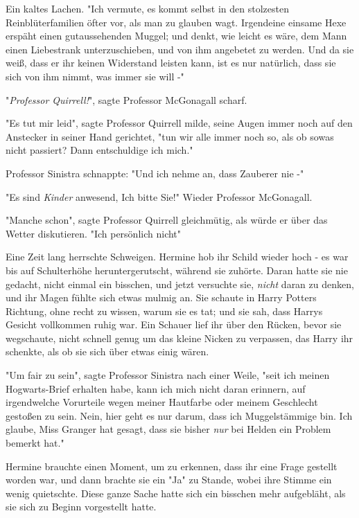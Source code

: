 {Ein kaltes Lachen. "Ich vermute, es kommt selbst in den stolzesten Reinblüterfamilien öfter vor, als man zu glauben wagt. Irgendeine einsame Hexe erspäht einen gutaussehenden Muggel; und denkt, wie leicht es wäre, dem Mann einen Liebestrank unterzuschieben, und von ihm angebetet zu werden. Und da sie weiß, dass er ihr keinen Widerstand leisten kann, ist es nur natürlich, dass sie sich von ihm nimmt, was immer sie will -"

"\emph{Professor Quirrell!}", sagte Professor McGonagall scharf.

"Es tut mir leid", sagte Professor Quirrell milde, seine Augen immer noch auf den Anstecker in seiner Hand gerichtet, "tun wir alle immer noch so, als ob sowas nicht passiert? Dann entschuldige ich mich."

Professor Sinistra schnappte: "Und ich nehme an, dass Zauberer nie -"

"Es sind \emph{Kinder} anwesend, Ich bitte Sie!" Wieder Professor McGonagall.

"Manche schon", sagte Professor Quirrell gleichmütig, als würde er über das Wetter diskutieren. "Ich persönlich nicht"

Eine Zeit lang herrschte Schweigen. Hermine hob ihr Schild wieder hoch - es war bis auf Schulterhöhe heruntergerutscht, während sie zuhörte. Daran hatte sie nie gedacht, nicht einmal ein bisschen, und jetzt versuchte sie, \emph{nicht} daran zu denken, und ihr Magen fühlte sich etwas mulmig an. Sie schaute in Harry Potters Richtung, ohne recht zu wissen, warum sie es tat; und sie sah, dass Harrys Gesicht vollkommen ruhig war. Ein Schauer lief ihr über den Rücken, bevor sie wegschaute, nicht schnell genug um das kleine Nicken zu verpassen, das Harry ihr schenkte, als ob sie sich über etwas einig wären.

"Um fair zu sein", sagte Professor Sinistra nach einer Weile, "seit ich meinen Hogwarts-Brief erhalten habe, kann ich mich nicht daran erinnern, auf irgendwelche Vorurteile wegen meiner Hautfarbe oder meinem Geschlecht gestoßen zu sein. Nein, hier geht es nur darum, dass ich Muggelstämmige bin. Ich glaube, Miss Granger hat gesagt, dass sie bisher \emph{nur} bei Helden ein Problem bemerkt hat."

Hermine brauchte einen Moment, um zu erkennen, dass ihr eine Frage gestellt worden war, und dann brachte sie ein "Ja" zu Stande, wobei ihre Stimme ein wenig quietschte. Diese ganze Sache hatte sich ein bisschen mehr aufgebläht, als sie sich zu Beginn vorgestellt hatte.

}

